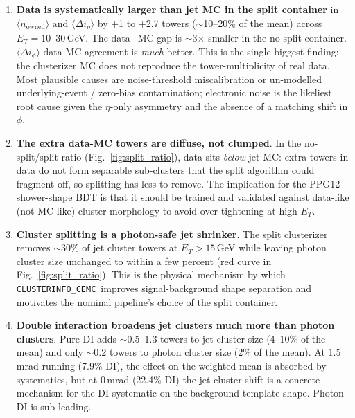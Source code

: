 \documentclass[11pt,a4paper]{article}
\newcommand{\splitnode}{\texttt{CLUSTERINFO\_CEMC}}
\begin{document}
\begin{enumerate}
\item \textbf{Data is systematically larger than jet MC in the split
  container} in $\langle n_{\mathrm{owned}}\rangle$ and $\langle \Delta i_\eta\rangle$
  by +1 to +2.7 towers ($\sim$10--20\% of the mean) across $E_T = 10$--30\,GeV.
  The data$-$MC gap is $\sim$3$\times$ smaller in the no-split container.
  $\langle \Delta i_\phi\rangle$ data-MC agreement is \textit{much} better.
  This is the single biggest finding: the clusterizer MC does not
  reproduce the tower-multiplicity of real data.  Most plausible causes
  are noise-threshold miscalibration or un-modelled underlying-event /
  zero-bias contamination; electronic noise is the likeliest root cause
  given the $\eta$-only asymmetry and the absence of a matching shift
  in $\phi$.

\item \textbf{The extra data-MC towers are diffuse, not clumped}.
  In the no-split/split ratio (Fig.~\ref{fig:split_ratio}), data sits
  \emph{below} jet MC:  extra towers in data do not form separable
  sub-clusters that the split algorithm could fragment off, so splitting
  has less to remove.  The implication for the PPG12 shower-shape BDT is
  that it should be trained and validated against data-like (not
  MC-like) cluster morphology to avoid over-tightening at high $E_T$.

\item \textbf{Cluster splitting is a photon-safe jet shrinker}. The
  split clusterizer removes $\sim$30\% of jet cluster towers at
  $E_T > 15$\,GeV while leaving photon cluster size unchanged to within
  a few percent (red curve in Fig.~\ref{fig:split_ratio}).  This is
  the physical mechanism by which \splitnode\ improves
  signal-background shape separation and motivates the nominal
  pipeline's choice of the split container.

\item \textbf{Double interaction broadens jet clusters much more than
  photon clusters}.  Pure DI adds $\sim$0.5--1.3 towers to jet cluster
  size (4--10\% of the mean) and only $\sim$0.2 towers to photon
  cluster size (2\% of the mean).  At 1.5\,mrad running (7.9\% DI), the effect
  on the weighted mean is absorbed by systematics, but at 0\,mrad
  (22.4\% DI) the jet-cluster shift is a concrete mechanism for the DI
  systematic on the background template shape.  Photon DI is sub-leading.
\end{enumerate}
\end{document}
